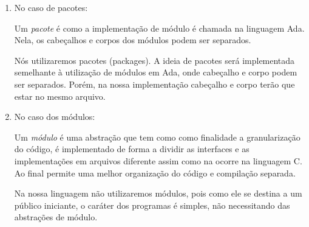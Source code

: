 \begin{enumerate}
        \item
		No caso de pacotes:

        Um \emph{pacote} é como a implementação de módulo é chamada na
        linguagem Ada. Nela, os cabeçalhos e corpos dos módulos podem ser
        separados.

        Nós utilizaremos pacotes (packages). A ideia de pacotes será
        implementada semelhante à utilização de módulos em Ada, onde cabeçalho
        e corpo podem ser separados. Porém, na nossa implementação cabeçalho e
        corpo terão que estar no mesmo arquivo.

        \item
        No caso dos módulos:

        Um \emph{módulo} é uma abstração que tem como como finalidade a
        granularização do código, é implementado de forma a dividir as
        interfaces e as implementações em arquivos diferente assim como na
        ocorre na linguagem C. Ao final permite uma melhor organização do
        código e compilação separada.

        Na nossa linguagem não utilizaremos módulos, pois como ele se destina a
        um público iniciante, o caráter dos programas é simples, não
        necessitando das abstrações de módulo.
\end{enumerate}